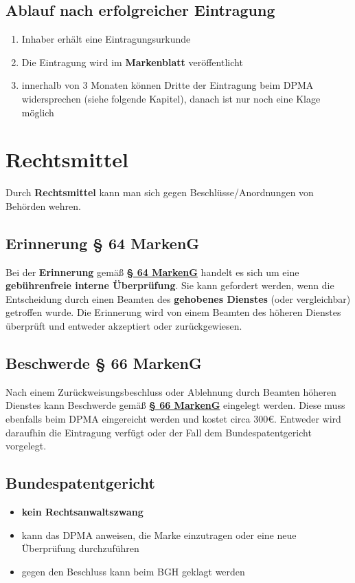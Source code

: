 \documentclass[12pt,A4]{extarticle}
\newcommand{\highlight}[1]{\textcolor{highlightColor}{\textbf{#1}}}
\newcommand{\markenG}[2][]{\textbf{\textcolor{markenGesetzLink}{\href{https://www.gesetze-im-internet.de/markeng/__#2.html}{§ #2 \ifthenelse{\equal{#1}{}}{}{#1 }MarkenG}}}}
\begin{document}
\subsection{Ablauf nach erfolgreicher Eintragung}
\begin{enumerate}
  \item{Inhaber erhält eine Eintragungsurkunde}
  \item{Die Eintragung wird im \textbf{Markenblatt} veröffentlicht}
  \item{innerhalb von 3 Monaten können Dritte der Eintragung beim DPMA widersprechen (siehe folgende Kapitel), danach ist nur noch eine Klage möglich}
\end{enumerate}

\section{Rechtsmittel}
Durch \textbf{Rechtsmittel} kann man sich gegen Beschlüsse/Anordnungen von Behörden wehren.

\subsection{Erinnerung § 64 MarkenG}
Bei der \highlight{Erinnerung} gemäß \markenG{64} handelt es sich um eine \textbf{gebührenfreie interne Überprüfung}. Sie kann gefordert werden, wenn die Entscheidung durch einen Beamten des \textbf{gehobenes Dienstes} (oder vergleichbar) getroffen wurde. Die Erinnerung wird von einem Beamten des höheren Dienstes überprüft und entweder akzeptiert oder zurückgewiesen.

\subsection{Beschwerde § 66 MarkenG}
Nach einem Zurückweisungsbeschluss oder Ablehnung durch Beamten höheren Dienstes kann Beschwerde gemäß \markenG{66} eingelegt werden. Diese muss ebenfalls beim DPMA eingereicht werden und kostet circa 300€. Entweder wird daraufhin die Eintragung verfügt oder der Fall dem Bundespatentgericht vorgelegt.

\subsection{Bundespatentgericht}
\begin{itemize}
  \item{\textbf{kein Rechtsanwaltszwang}}
  \item{kann das DPMA anweisen, die Marke einzutragen oder eine neue Überprüfung durchzuführen}
  \item{gegen den Beschluss kann beim BGH geklagt werden}
\end{itemize}
\end{document}
